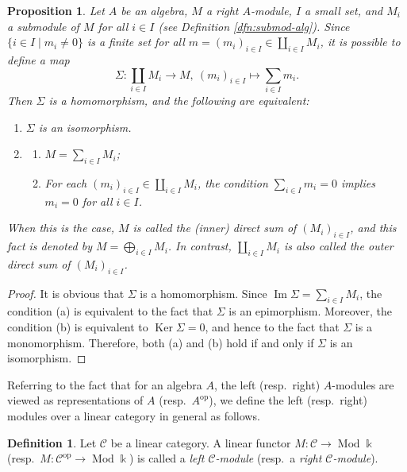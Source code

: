 \documentclass{surv-l}
\numberwithin{equation}{chapter}
\numberwithin{figure}{chapter}
\theoremstyle{plain}
\newtheorem{prp}[thm]{Proposition}
\theoremstyle{definition}
\newtheorem{dfn}[thm]{Definition}
\theoremstyle{remark}
\DeclareMathOperator{\Ker}{Ker}
\DeclareMathOperator{\Mod}{Mod}
\begin{document}
\begin{prp}
Let $A$ be an algebra, $M$ a right $A$-module,
$I$ a small set, and $M_i$ a \emph{submodule} of $M$ for all $i \in I$
{\rm (see Definition \ref{dfn:submod-alg})}.
Since $\{i \in I \mid m_i \ne 0\}$ is a finite set
for all $m = (m_i)_{i\in I} \in \coprod_{i\in I}M_i$,
it is possible to define a map
\[
\Sigma \colon \coprod_{i\in I}M_i \to M, \ (m_i)_{i\in I} \mapsto \sum_{i\in I}m_i.
\]
Then $\Sigma$ is a homomorphism, and the following are equivalent:
\begin{enumerate}
\item
$\Sigma$ is an isomorphism.
\item
\begin{enumerate}
\item
$M = \sum_{i\in I}M_i$;
\item
For each $(m_i)_{i\in I} \in \coprod_{i\in I}M_i$,
the condition $\sum_{i\in I}m_i = 0$ implies $m_i = 0$ for all $i\in I$.
\end{enumerate}
\end{enumerate}
When this is the case,
$M$ is called the \emph{(inner) direct sum} of $(M_i)_{i\in I}$,
and this fact is denoted by $M = \bigoplus_{i \in I} M_i$.
In contrast,
$\coprod_{i\in I}M_i$ is also called the \emph{outer direct sum}
of $(M_i)_{i\in I}$.
\end{prp}

\begin{proof}
It is obvious that $\Sigma$ is a homomorphism.
Since $\operatorname{Im}\Sigma = \sum_{i\in I}M_i$, the condition (a)
is equivalent to the fact that $\Sigma$ is an epimorphism.
Moreover,  the condition (b) is equivalent to
$\Ker \Sigma = 0$, and hence to the fact that $\Sigma$ is a monomorphism.
Therefore, both (a) and (b) hold if and only if
$\Sigma$ is an isomorphism.
\end{proof}

Referring to the fact that for an algebra $A$, the left (resp.\ right) $A$-modules are viewed as representations of $A$ (resp.\ $A^{\mathrm{op}}$),
we define the left (resp.\ right) modules over a linear category in general as follows.

\begin{dfn}
Let ${\mathcal{C}}$ be a linear category.
A linear functor $M\colon {\mathcal{C}} \to \Mod \Bbbk$ (resp.\ $M\colon {\mathcal{C}}^{\mathrm{op}} \to \Mod \Bbbk$)
is called a \emph{left ${\mathcal{C}}$-module} (resp.\ a \emph{right ${\mathcal{C}}$-module}).
\end{dfn}
\end{document}
